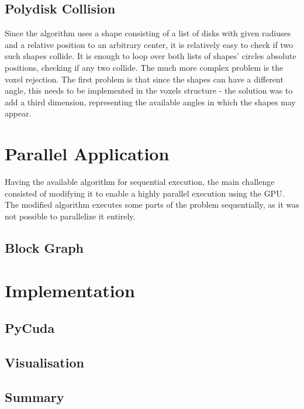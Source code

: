 \documentclass[12pt, oneside]{report}
\begin{document}
\subsection{Polydisk Collision}

Since the algorithm uses a shape consisting of a list of disks with given radiuses and a relative position to an arbitrary center, it is relatively easy to check if two such shapes collide. It is enough to loop over both lists of shapes' circles absolute positions, checking if any two collide. \newline
The much more complex problem is the voxel rejection. The first problem is that since the shapes can have a different angle, this needs to be implemented in the voxels structure - the solution was to add a third dimension, representing the available angles in which the shapes may appear.



\section {Parallel Application}

Having the available algorithm for sequential execution, the main challenge consisted of modifying it to enable a highly parallel execution using the GPU. The modified algorithm executes some parts of the problem sequentially, as it was not possible to parallelize it entirely.

\subsection{Block Graph}
\section {Implementation}
\subsection{PyCuda}
\subsection{Visualisation}
\subsection{Summary}
\end{document}
